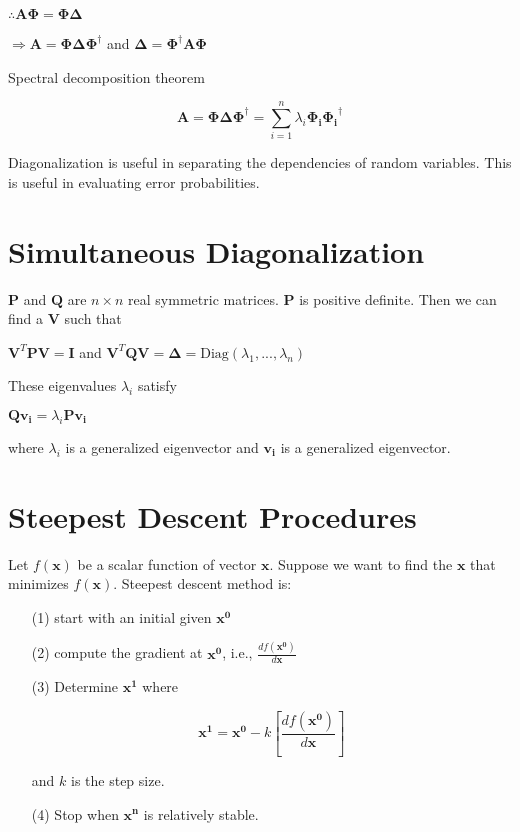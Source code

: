 \documentclass[fleqn]{article}
\begin{document}
	$\therefore \mathbf{A\Phi} = \mathbf{\Phi\Delta}$
	
	$\Rightarrow \mathbf{A} = \mathbf{\Phi\Delta}\mathbf{\Phi}^{\dag}$ and $\mathbf{\Delta} = \mathbf{\Phi}^{\dag}\mathbf{A\Phi}$
	
	Spectral decomposition theorem
	
	\begin{equation*}
		\mathbf{A} = \mathbf{\Phi\Delta}\mathbf{\Phi}^{\dag} = \sum_{i=1}^{n}\lambda_i\mathbf{\Phi_i}\mathbf{\Phi_i}^{\dag}
	\end{equation*}
	
	Diagonalization is useful in separating the dependencies of random variables. This is useful in evaluating error probabilities.
	
	\section{Simultaneous Diagonalization}
	
	$\mathbf{P}$ and $\mathbf{Q}$ are $n \times n$ real symmetric matrices. $\mathbf{P}$ is positive definite. Then we can find a $\mathbf{V}$ such that
	
	$\mathbf{V}^T\mathbf{PV} = \mathbf{I}$ and $\mathbf{V}^T\mathbf{QV} = \mathbf{\Delta} = \text{Diag}(\lambda_1,...,\lambda_n)$
	
	These eigenvalues $\lambda_i$ satisfy
	
	$\mathbf{Qv_i} = \lambda_i\mathbf{Pv_i}$
	
	where $\lambda_i$ is a generalized eigenvector and $\mathbf{v_i}$ is a generalized eigenvector.
	
	\section{Steepest Descent Procedures}
	
	Let $f(\mathbf{x})$ be a scalar function of vector $\mathbf{x}$. Suppose we want to find the $\mathbf{x}$ that minimizes $f(\mathbf{x})$. Steepest descent method is:
	
	\begin{enumerate}
	
		\item[(1)] start with an initial given $\mathbf{x^0}$
		
		\item[(2)] compute the gradient at $\mathbf{x^0}$, i.e., $\frac{df(\mathbf{x^0})}{d\mathbf{x}}$
		
		\item[(3)] Determine $\mathbf{x^1}$ where
		
		\begin{equation*}
			\mathbf{x^1} = \mathbf{x^0} - k\left[\frac{df(\mathbf{x^0})}{d\mathbf{x}}\right]
		\end{equation*}
		
		and $k$ is the step size.
		
		\item[(4)] Stop when $\mathbf{x^n}$ is relatively stable.
	\end{enumerate}
\end{document}
